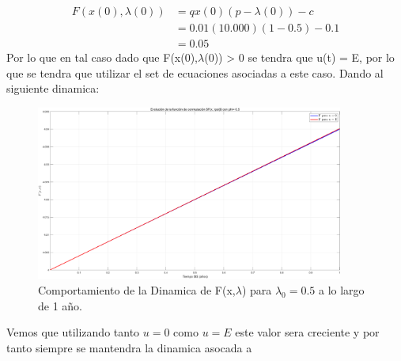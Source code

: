 \begin{itemize}
\begin{align}
	F(x(0),\lambda(0))&= qx(0)(p-\lambda(0)) -c\\
	      		&= 0.01(10.000)(1-0.5)-0.1\\
				&= 0.05
\end{align}
Por lo que en tal caso dado que F(x(0),$\lambda$(0)) > 0 se tendra que u(t) = E, por lo que se tendra que utilizar el set de ecuaciones asociadas a este caso. Dando al siguiente dinamica:
\begin{figure}
	\centering
	\includegraphics[width=0.9\textwidth]{img/[P2] Phi =0.5.png}
	\caption{Comportamiento de la Dinamica de F(x,$\lambda$) para $\lambda_{0}=0.5$ a lo largo de 1 año.}
	\label{img:dinamica-0.5}
\end{figure}
Vemos que utilizando tanto $u=0$ como $u=E$ este valor sera creciente y por tanto siempre se mantendra la dinamica asocada a 
\end{itemize}
